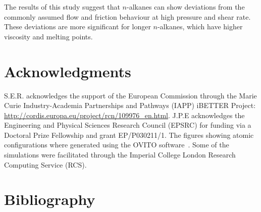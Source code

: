 \documentclass[5p]{elsarticle}
\begin{document}
The results of this study suggest that $n$-alkanes can show deviations from the commonly assumed flow and friction behaviour at high pressure and shear rate. These deviations are more significant for longer $n$-alkanes, which have higher viscosity and melting points.

\section*{Acknowledgments}

S.E.R. acknowledges the support of the European Commission through the Marie Curie Industry-Academia Partnerships and Pathways (IAPP) iBETTER Project: \url{http://cordis.europa.eu/project/rcn/109976_en.html}. J.P.E acknowledges the Engineering and Physical Sciences Research Council (EPSRC) for funding via a Doctoral Prize Fellowship and grant EP/P030211/1. The figures showing atomic configurations where generated using the OVITO software~\cite{Stukowski2010b}. Some of the simulations were facilitated through the Imperial College London Research Computing Service (RCS).


\section*{Bibliography}


%
%



\end{document}
